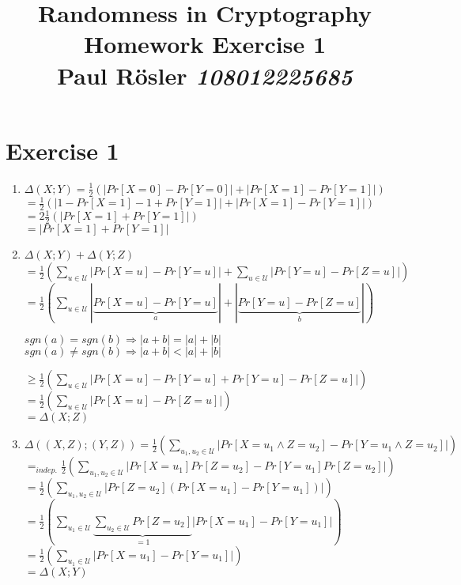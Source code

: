 \documentclass[11pt]{scrartcl}
\title{Randomness in Cryptography\\Homework Exercise 1\\Paul Rösler \emph{108012225685}}
\begin{document}
\maketitle

\section*{Exercise 1}
\begin{enumerate}
	\item $\Delta(X;Y) = \frac{1}{2}(|Pr[X=0]-Pr[Y=0]|+|Pr[X=1]-Pr[Y=1]|)$\\
	$= \frac{1}{2}(|1-Pr[X=1]-1+Pr[Y=1]|+|Pr[X=1]-Pr[Y=1]|)$\\
	$= 2\frac{1}{2}(|Pr[X=1]+Pr[Y=1]|)$\\
	$=|Pr[X=1]+Pr[Y=1]|$\\
\item $\Delta(X;Y)+\Delta(Y;Z)$\\
	$= \frac{1}{2}(\sum_{u\in\mathcal{U}} |Pr[X=u]-Pr[Y=u]|+\sum_{u\in\mathcal{U}} |Pr[Y=u]-Pr[Z=u]|)$\\
	$=\frac{1}{2}(\sum_{u\in\mathcal{U}} |\underbrace{Pr[X=u]-Pr[Y=u]}_a |+ |\underbrace{Pr[Y=u]-Pr[Z=u]}_b|)$\\
	
	\begin{addmargin}{1cm}
	$sgn(a)=sgn(b) \Rightarrow |a+b|=|a|+|b|$\\
	$sgn(a)\neq sgn(b) \Rightarrow |a+b|<|a|+|b|$
	\end{addmargin} 

	$\geq \frac{1}{2}(\sum_{u\in\mathcal{U}} |Pr[X=u]-Pr[Y=u] + Pr[Y=u]-Pr[Z=u]|)$\\
	$= \frac{1}{2}(\sum_{u\in\mathcal{U}} |Pr[X=u]-Pr[Z=u]|)$\\
	$= \Delta(X;Z)$\\
\item $\Delta((X,Z);(Y,Z))= \frac{1}{2}(\sum_{u_1,u_2\in\mathcal{U}} |Pr[X=u_1 \wedge Z=u_2]-Pr[Y=u_1 \wedge Z=u_2]|)$\\
	$=_{indep.} \frac{1}{2}(\sum_{u_1,u_2\in\mathcal{U}} |Pr[X=u_1] Pr[Z=u_2]-Pr[Y=u_1] Pr[Z=u_2]|)$\\
	$= \frac{1}{2}(\sum_{u_1,u_2\in\mathcal{U}} | Pr[Z=u_2] (Pr[X=u_1]-Pr[Y=u_1])|)$\\
	$= \frac{1}{2}(\sum_{u_1\in\mathcal{U}} \underbrace{\sum_{u_2\in\mathcal{U}} Pr[Z=u_2]}_{=1} |Pr[X=u_1]-Pr[Y=u_1]|)$\\
	$= \frac{1}{2}(\sum_{u_1\in\mathcal{U}} |Pr[X=u_1]-Pr[Y=u_1]|)$\\
	$= \Delta(X;Y)$\\
\end{enumerate}
\end{document}
